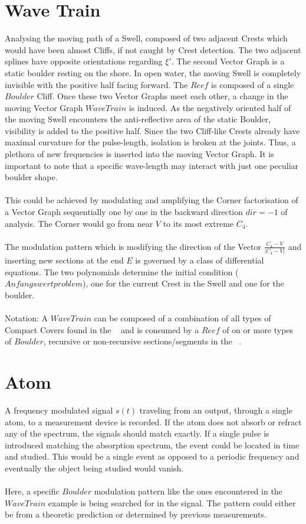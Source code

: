 \documentclass{report}
\begin{document}
\section{Wave Train}
Analysing the moving path of a Swell, composed of two adjacent Crests which would have been almost Cliffs, if not caught by Crest detection. The two adjacent splines have opposite orientations regarding $\xi'$. The second Vector Graph is a static boulder resting on the shore. In open water, the moving Swell is completely invisible with the positive half facing forward. The $Reef$ is composed of a single $Boulder$ Cliff. Once these two Vector Graphs meet each other, a change in the moving Vector Graph $Wave Train$ is induced. As the negatively oriented half of the moving Swell encounters the anti-reflective area of the static Boulder, visibility is added to the positive half. Since the two Cliff-like Crests already have maximal curvature for the pulse-length, isolation is broken at the joints. Thus, a plethora of new frequencies is inserted into the moving Vector Graph. It is important to note that a specific wave-length may interact with just one peculiar boulder shape.\\\\
This could be achieved by modulating and amplifying the Corner factorisation of a Vector Graph sequentially one by one in the backward direction $dir=-1$ of analysis. The Corner would go from near $V$ to its most extreme $C_{4}$.\\\\
The modulation pattern which is modifying the direction of the Vector $\frac{C_{4}-V}{\lvert C_{4}-V \rvert}$ and inserting new sections at the end $E$ is governed by a class of differential equations. The two polynomials determine the initial condition ($Anfangswertproblem$), one for the current Crest in the Swell and one for the boulder.\\\\
Notation: A $Wave Train$ can be composed of a combination of all types of Compact Covers found in the ~\cite[Stopeight\_Analyzer.tex]{Analyzer} and is consumed by a $Reef$ of on or more types of $Boulder$, recursive or non-recursive sections/segments in the ~\cite[Stopeight\_Analyzer.tex]{Analyzer}.
\section{Atom}
A frequency modulated signal $s(t)$ traveling from an output, through a single atom, to a measurement device is recorded. If the atom does not absorb or refract any of the spectrum, the signals should match exactly. If a single pulse is introduced matching the absorption spectrum, the event could be located in time and studied. This would be a single event as opposed to a periodic frequency and eventually the object being studied would vanish.\\\\
Here, a specific $Boulder$ modulation pattern like the ones encountered in the $Wave Train$ example is being searched for in the signal. The pattern could either be from a theoretic prediction or determined by previous measurements.
\end{document}
